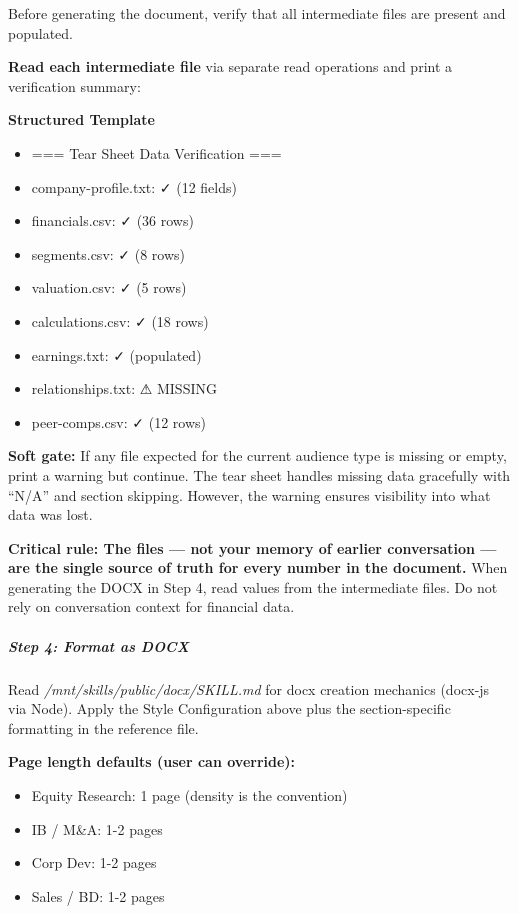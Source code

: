 \documentclass[11pt]{article}
\begin{document}
Before generating the document, verify that all intermediate files are present and populated.


\textbf{Read each intermediate file} via separate read operations and print a verification summary:


\textbf{Structured Template}
\begin{itemize}[leftmargin=*,itemsep=2pt,topsep=2pt]
\item {} === Tear Sheet Data Verification ===
\item {} company-profile.txt: ✓ (12 fields)
\item {} financials.csv: ✓ (36 rows)
\item {} segments.csv: ✓ (8 rows)
\item {} valuation.csv: ✓ (5 rows)
\item {} calculations.csv: ✓ (18 rows)
\item {} earnings.txt: ✓ (populated)
\item {} relationships.txt: ⚠ MISSING
\item {} peer-comps.csv: ✓ (12 rows)
\end{itemize}

\textbf{Soft gate:} If any file expected for the current audience type is missing or empty, print a warning but continue. The tear sheet handles missing data gracefully with ``N/A'' and section skipping. However, the warning ensures visibility into what data was lost.


\textbf{Critical rule: The files — not your memory of earlier conversation — are the single source of truth for every number in the document.} When generating the DOCX in Step 4, read values from the intermediate files. Do not rely on conversation context for financial data.


\subparagraph{Step 4: Format as DOCX}\mbox{}\par

Read \emph{/mnt/skills/public/docx/SKILL.md} for docx creation mechanics (docx-js via Node). Apply the Style Configuration above plus the section-specific formatting in the reference file.


\textbf{Page length defaults (user can override):}

\begin{itemize}[leftmargin=*,itemsep=2pt,topsep=2pt]
\item {} Equity Research: 1 page (density is the convention)
\item {} IB / M\&A: 1-2 pages
\item {} Corp Dev: 1-2 pages
\item {} Sales / BD: 1-2 pages
\end{itemize}
\end{document}
